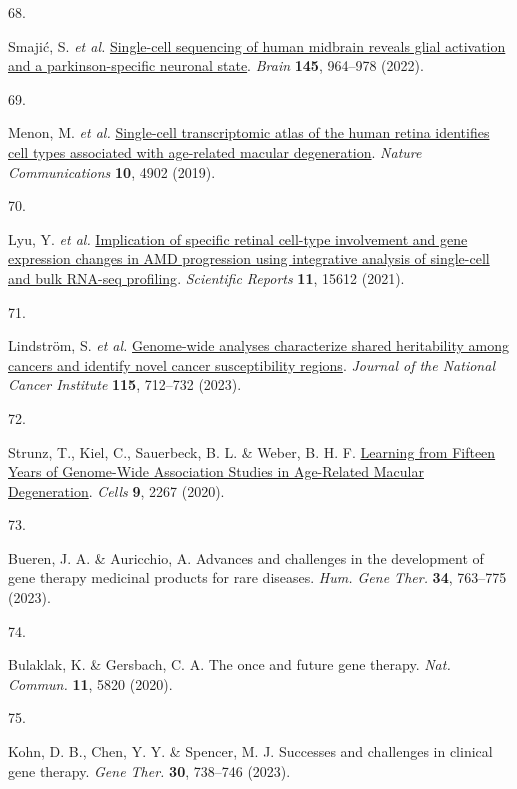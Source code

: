 \documentclass[
]{article}
\newlength{\cslhangindent}
\newlength{\csllabelwidth}
\newenvironment{CSLReferences}[2] %
 {\begin{list}{}{%
  \setlength{\itemindent}{0pt}
  \setlength{\leftmargin}{0pt}
  \setlength{\parsep}{0pt}
  \ifodd #1
   \setlength{\leftmargin}{\cslhangindent}
   \setlength{\itemindent}{-1\cslhangindent}
  \fi
  \setlength{\itemsep}{#2\baselineskip}}}
 {\end{list}}
\newcommand{\CSLLeftMargin}[1]{\parbox[t]{\csllabelwidth}{\strut#1\strut}}
\newcommand{\CSLRightInline}[1]{\parbox[t]{\linewidth - \csllabelwidth}{\strut#1\strut}}
\begin{document}
\begin{CSLReferences}{0}{0}
\CSLLeftMargin{68. }%
\CSLRightInline{Smajić, S. \emph{et al.}
\href{https://doi.org/10.1093/brain/awab446}{Single-cell sequencing of
human midbrain reveals glial activation and a parkinson-specific
neuronal state}. \emph{Brain} \textbf{145}, 964--978 (2022).}

\CSLLeftMargin{69. }%
\CSLRightInline{Menon, M. \emph{et al.}
\href{https://doi.org/10.1038/s41467-019-12780-8}{Single-cell
transcriptomic atlas of the human retina identifies cell types
associated with age-related macular degeneration}. \emph{Nature
Communications} \textbf{10}, 4902 (2019).}

\CSLLeftMargin{70. }%
\CSLRightInline{Lyu, Y. \emph{et al.}
\href{https://doi.org/10.1038/s41598-021-95122-3}{Implication of
specific retinal cell-type involvement and gene expression changes in
AMD progression using integrative analysis of single-cell and bulk
RNA-seq profiling}. \emph{Scientific Reports} \textbf{11}, 15612
(2021).}

\CSLLeftMargin{71. }%
\CSLRightInline{Lindström, S. \emph{et al.}
\href{https://doi.org/10.1093/jnci/djad043}{Genome-wide analyses
characterize shared heritability among cancers and identify novel cancer
susceptibility regions}. \emph{Journal of the National Cancer Institute}
\textbf{115}, 712--732 (2023).}

\CSLLeftMargin{72. }%
\CSLRightInline{Strunz, T., Kiel, C., Sauerbeck, B. L. \& Weber, B. H.
F. \href{https://doi.org/10.3390/cells9102267}{Learning from Fifteen
Years of Genome-Wide Association Studies in Age-Related Macular
Degeneration}. \emph{Cells} \textbf{9}, 2267 (2020).}

\CSLLeftMargin{73. }%
\CSLRightInline{Bueren, J. A. \& Auricchio, A. Advances and challenges
in the development of gene therapy medicinal products for rare diseases.
\emph{Hum. Gene Ther.} \textbf{34}, 763--775 (2023).}

\CSLLeftMargin{74. }%
\CSLRightInline{Bulaklak, K. \& Gersbach, C. A. The once and future gene
therapy. \emph{Nat. Commun.} \textbf{11}, 5820 (2020).}

\CSLLeftMargin{75. }%
\CSLRightInline{Kohn, D. B., Chen, Y. Y. \& Spencer, M. J. Successes and
challenges in clinical gene therapy. \emph{Gene Ther.} \textbf{30},
738--746 (2023).}


\end{CSLReferences}
\end{document}

